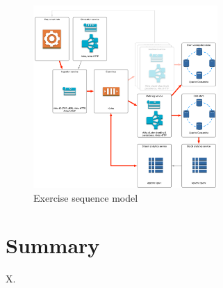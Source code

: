 \documentclass[a4paper, 10 pt, conference]{IEEEtran}
\begin{document}
\begin{figure}[h]
	\begin{center}
		\caption{Exercise sequence model}
		\label{fig:ri-architecture}
		\includegraphics[width=7cm,keepaspectratio]{ri-arch.png}
	\end{center}
\end{figure}

\section{Summary}

\addtolength{\textheight}{-12cm}  %

\begin{thebibliography}{99}

 X.

\end{thebibliography}
\end{document}
